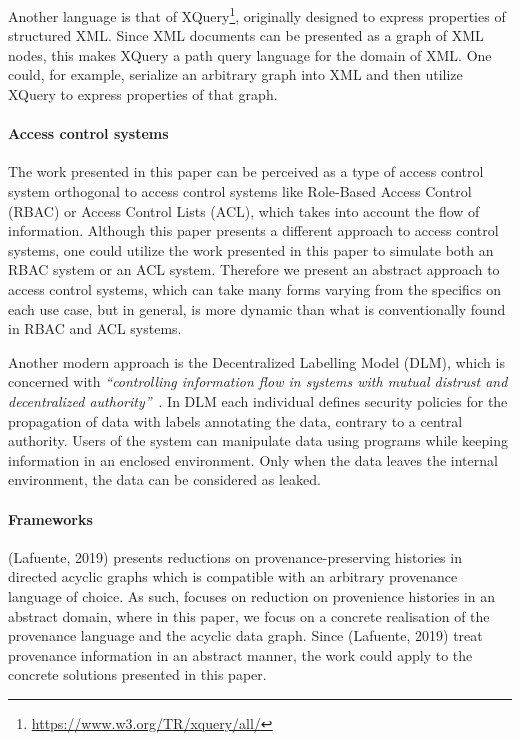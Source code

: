 Another language is that of XQuery\footnote{\href{https://www.w3.org/TR/xquery/all/}{https://www.w3.org/TR/xquery/all/}}, originally designed to express properties of structured XML. Since XML documents can be presented as a graph of XML nodes, this makes XQuery a path query language for the domain of XML. One could, for example, serialize an arbitrary graph into XML and then utilize XQuery to express properties of that graph.

\paragraph{Access control systems}
The work presented in this paper can be perceived as a type of access control system orthogonal to access control systems like Role-Based Access Control (RBAC) or Access Control Lists (ACL), which takes into account the flow of information. Although this paper presents a different approach to access control systems, one could utilize the work presented in this paper to simulate both an RBAC system or an ACL system. Therefore we present an abstract approach to access control systems, which can take many forms varying from the specifics on each use case, but in general, is more dynamic than what is conventionally found in RBAC and ACL systems.

Another modern approach is the Decentralized Labelling Model (DLM), which is concerned with \emph{``controlling information flow in systems with mutual distrust and decentralized authority''}~\cite{myers1997decentralized}. In DLM each individual defines security policies for the propagation of data with labels annotating the data, contrary to a central authority. Users of the system can manipulate data using programs while keeping information in an enclosed environment. Only when the data leaves the internal environment, the data can be considered as leaked.

\paragraph{Frameworks} (Lafuente, 2019)\cite{lafuente2019framework} presents reductions on provenance-preserving histories in directed acyclic graphs which is compatible with an arbitrary provenance language of choice. As such, \cite{lafuente2019framework} focuses on reduction on provenience histories in an abstract domain, where in this paper, we focus on a concrete realisation of the provenance language and the acyclic data graph. Since (Lafuente, 2019)\cite{lafuente2019framework} treat provenance information in an abstract manner, the work could apply to the concrete solutions presented in this paper.